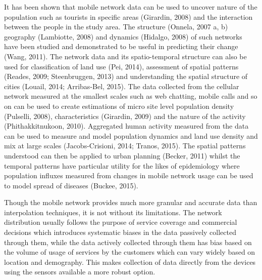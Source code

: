  It has been shown that mobile network data can be used to uncover nature of the population such as tourists in specific areas (Girardin, 2008) and the interaction between the people in the study area. The structure (Onnela, 2007 a, b) geography (Lambiotte, 2008) and dynamics (Hidalgo, 2008) of such networks have been studied and demonstrated to be useful in predicting their change (Wang, 2011). The network data and its spatio-temporal structure can also be used for classification of land use (Pei, 2014), assessment of spatial patterns (Reades, 2009; Steenbruggen, 2013) and understanding the spatial structure of cities (Louail, 2014; Arribas-Bel, 2015). The data collected from the cellular network measured at the smallest scales such as web chatting, mobile calls and so on can be used to create estimations of micro site level population density (Pulselli, 2008), characteristics (Girardin, 2009) and the nature of the activity (Phithakkitnukoon, 2010). Aggregated human activity measured from the data can be used to measure and model population dynamics and land use density and mix at large scales (Jacobs-Crisioni, 2014; Tranos, 2015). The spatial patterns understood can then be applied to urban planning (Becker, 2011) whilst the temporal patterns have particular utility for the likes of epidemiology where population influxes measured from changes in mobile network usage can be used to model spread of diseases (Buckee, 2015).

 Though the mobile network provides much more granular and accurate data than interpolation techniques, it is not without its limitations. The network distribution usually follows the purpose of service coverage and commercial decisions which introduces systematic biases in the data passively collected through them, while the data actively collected through them has bias based on the volume of usage of services by the customers which can vary widely based on location and demography. This makes collection of data directly from the devices using the sensors available a more robust option.

